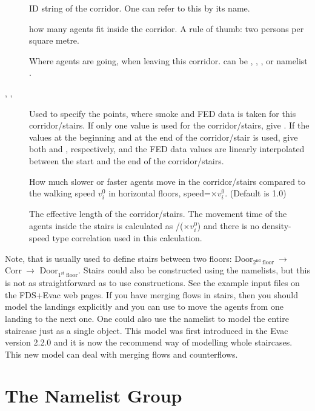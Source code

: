 \documentclass[12pt,a4paper,final,twoside]{stylevk}
\begin{document}
\begin{description}
%
\item[] ID string of the corridor. One can refer to this
   by its name.
%
\item[] how many agents fit inside the
  corridor.  A rule of thumb: two persons per square metre.
%
\item[] Where agents are going, when leaving this
  corridor.  can be , ,
  , or  namelist .
%
\item[, , ] Used to specify the
  points, where smoke and FED data is taken for this corridor/stairs.
  If only one value is used for the corridor/stairs, give .
  If the values at the beginning and at the end of the corridor/stair
  is used, give both  and , respectively, and
  the FED data values are linearly interpolated between the start and
  the end of the corridor/stairs.
%
\item[] How much slower or faster agents move in the
  corridor/stairs compared to the walking speed $v_i^0$ in horizontal
  floors, speed=$\times v_i^0$.  (Default is 1.0)
%
\item[] The effective length of the
  corridor/stairs.  The movement time of the agents inside the stairs
  is calculated as /($\times
  v_i^0$) and there is no density-speed type correlation used in this
  calculation. 
%
\end{description}
%
Note, that  is usually used to define stairs between two
floors: $\mathrm{Door_{2^{nd} ~floor}} ~ \rightarrow$ $\mathrm{Corr} ~
\rightarrow$ $\mathrm{Door_{1^{st} ~floor}}$.  Stairs could also be
constructed using the  namelists, but this is not as
straightforward as to use  constructions.  See the
example input files on the FDS+Evac web pages.  If you have merging
flows in stairs, then you should model the landings explicitly and
you can use  to move the agents from one landing to the
next one.  One could also use the  namelist to model the
entire staircase just as a single object.  This model was first
introduced in the Evac version 2.2.0 and it is now the recommend way
of modelling whole staircases.  This new model can deal with merging
flows and counterflows.


\section{The  Namelist Group}\label{Sec_EvssNML}
\end{document}
